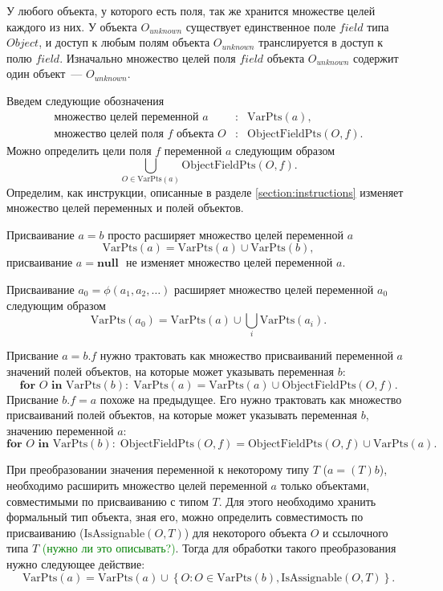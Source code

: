 \documentclass[14pt,titlepage]{extarticle}
\newcommand{\NULL}{\textbf{null }}
\newcommand{\VPts}[1]{\textrm{VarPts}(#1)}
\newcommand{\OFPts}[2]{\textrm{ObjectFieldPts}(#1, #2)}
\newcommand{\IsAssignable}[2]{\textrm{IsAssignable}(#1, #2)}
\newcommand{\remark}[1]{\textcolor{Green}{#1}}
\begin{document}
      У любого объекта, у которого есть поля, так же хранится множестве целей
      каждого из них. У объекта $O_{unknown}$ существует единственное поле
      $field$ типа $Object$, и доступ к любым полям объекта $O_{unknown}$
      транслируется в доступ к полю $field$. Изначально множество целей
      поля $field$ объекта $O_{unknown}$ содержит один объект~---
      $O_{unknown}$.

      Введем следующие обозначения
      \begin{eqnarray*}
        \textrm{множество целей переменной $a$}&:& \VPts{a}, \\
        \textrm{множество целей поля $f$ объекта $O$}&:& \OFPts{O}{f}.
      \end{eqnarray*}
      Можно определить цели поля $f$ переменной $a$ следующим образом
      \[ \bigcup\limits_{O \in \VPts{a}} \OFPts{O}{f}.\]
      Определим, как инструкции, описанные в разделе \ref{section:instructions}
      изменяет множество целей переменных и полей объектов.

      Присваивание $a = b$ просто расширяет множество целей переменной $a$
      \[\VPts{a} = \VPts{a} \cup \VPts{b},\]
      присваивание $a = \NULL$ не изменяет множество целей переменной $a$.

      Присваивание $a_0 = \phi(a_1, a_2, \ldots)$ расширяет множество целей
      переменной $a_0$ следующим образом
      \[\VPts{a_0} = \VPts{a} \cup \bigcup\limits_{i} \VPts{a_i}.\]

      Присвание $a = b.f$ нужно трактовать как множество присваиваний
      переменной $a$ значений полей объектов, на которые может указывать переменная
      $b$:
      \[
        \textbf{for } O \textbf{ in } \VPts{b} \colon
        \; \VPts{a} = \VPts{a} \cup \OFPts{O}{f}.
      \]
      Присвание $b.f = a$ похоже на предыдущее. Его нужно трактовать как
      множество присваиваний полей объектов, на которые может указывать
      переменная $b$, значению переменной $a$:
      \[
        \textbf{for } O \textbf{ in } \VPts{b} \colon
        \; \OFPts{O}{f} = \OFPts{O}{f} \cup \VPts{a}.
      \]

      При преобразовании значения переменной к некоторому типу $T$
      ($a = (T)b$), необходимо расширить множество целей переменной $a$ только
      объектами, совместимыми по присваиванию с типом $T$. Для этого необходимо
      хранить формальный тип объекта, зная его, можно определить совместимость
      по присваиванию ($\IsAssignable{O}{T}$) для некоторого объекта $O$ и
      ссылочного типа $T$\remark{ (нужно ли это описывать?)}.
      Тогда для обработки такого преобразования нужно следующее действие:
      \[
        \VPts{a} = \VPts{a} \cup
            \left\{ O \colon O \in \VPts{b}, \IsAssignable{O}{T} \right\}.
      \]
\end{document}
